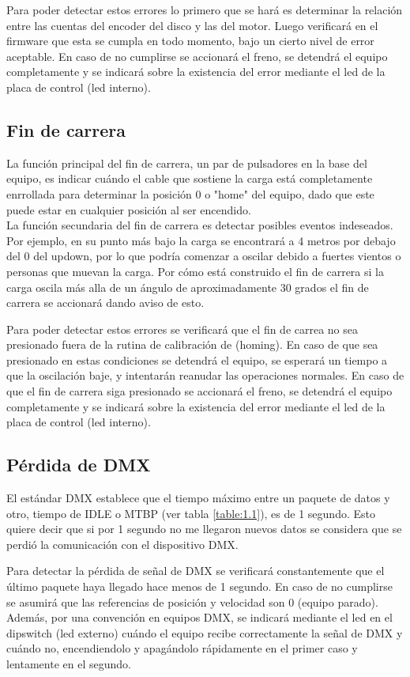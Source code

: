 Para poder detectar estos errores lo primero que se hará es determinar la relación entre las cuentas del encoder del disco y las del motor. Luego verificará en el firmware que esta se cumpla en todo momento, bajo un cierto nivel de error aceptable. En caso de no cumplirse se accionará el freno, se detendrá el equipo completamente y se indicará sobre la existencia del error mediante el led de la placa de control (led interno).

\subsection{Fin de carrera}
La función principal del fin de carrera, un par de pulsadores en la base del equipo, es indicar cuándo el cable que sostiene la carga está completamente enrrollada para determinar la posición 0 o "home" del equipo, dado que este puede estar en cualquier posición al ser encendido.\\
La función secundaria del fin de carrera es detectar posibles eventos indeseados. Por ejemplo, en su punto más bajo la carga se encontrará a 4 metros por debajo del 0 del updown, por lo que podría comenzar a oscilar debido a fuertes vientos o personas que muevan la carga. Por cómo está construido el fin de carrera si la carga oscila más alla de un ángulo de aproximadamente 30 grados el fin de carrera se accionará dando aviso de esto.

Para poder detectar estos errores se verificará que el fin de carrea no sea presionado fuera de la rutina de calibración de (homing). En caso de que sea presionado en estas condiciones se detendrá el equipo, se esperará un tiempo a que la oscilación baje, y intentarán reanudar las operaciones normales. En caso de que el fin de carrera siga presionado se accionará el freno, se detendrá el equipo completamente y se indicará sobre la existencia del error mediante el led de la placa de control (led interno).


\subsection{Pérdida de DMX}
El estándar DMX establece que el tiempo máximo entre un paquete de datos y otro, tiempo de IDLE o MTBP (ver tabla \ref{table:1.1}), es de 1 segundo. Esto quiere decir que si por 1 segundo no me llegaron nuevos datos se considera que se perdió la comunicación con el dispositivo DMX.

Para detectar la pérdida de señal de DMX se verificará constantemente que el último paquete haya llegado hace menos de 1 segundo. En caso de no cumplirse se asumirá que las referencias de posición y velocidad son 0 (equipo parado). Además, por una convención en equipos DMX, se indicará mediante el led en el dipswitch (led externo) cuándo el equipo recibe correctamente la señal de DMX y cuándo no, encendiendolo y apagándolo rápidamente en el primer caso y lentamente en el segundo.


